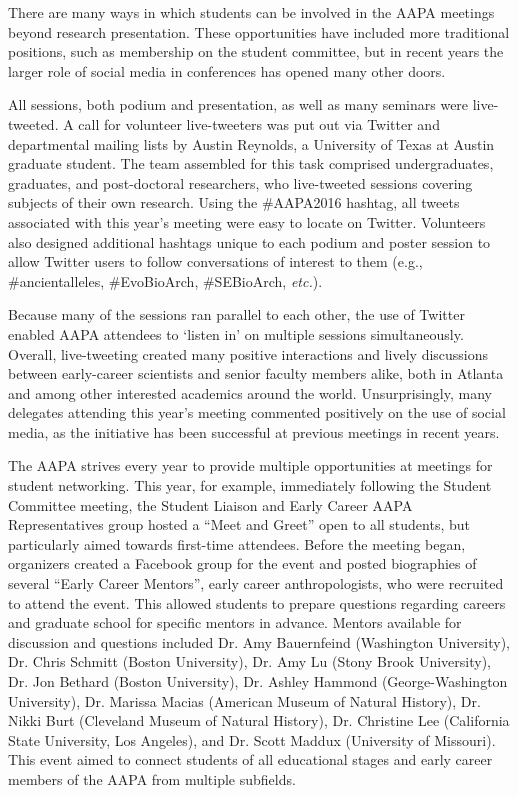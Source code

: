 \documentclass[english]{ijsra}
\begin{document}
There  are many ways in which students can be involved in the AAPA meetings beyond research presentation.  These opportunities have included more traditional positions, such as membership on the student committee, but in recent years the larger role of social media in conferences has opened many other doors.  

All sessions, both podium and presentation, as well as many seminars were live-tweeted.
A call for volunteer live-tweeters was put out via Twitter and departmental mailing lists by Austin Reynolds,
a University of Texas at Austin graduate student. 
The team assembled for this task comprised undergraduates, graduates, and post-doctoral researchers, 
who live-tweeted sessions covering subjects of their own research. 
Using the #AAPA2016 hashtag, all tweets associated with this year’s meeting were easy to locate on Twitter. 
Volunteers also designed additional hashtags unique to each podium and poster session to allow Twitter users to
follow conversations of interest to them (e.g., #ancientalleles, #EvoBioArch, #SEBioArch, \emph{etc.}).%

Because many of the sessions ran parallel to each other, the use of Twitter enabled AAPA attendees to ‘listen in’ on multiple sessions simultaneously. 
Overall, live-tweeting created many positive interactions and lively discussions between early-career scientists and senior faculty members alike, both in Atlanta and among other interested academics around the world.
Unsurprisingly, many delegates attending this year’s meeting commented positively on the use of social media, as the initiative has been successful at previous meetings in recent years.

The  AAPA strives every year to provide multiple opportunities at meetings for student networking.
This year, for example, immediately following the Student Committee meeting, 
the Student Liaison and Early Career AAPA Representatives group hosted a “Meet and Greet” open to all students,
but particularly aimed towards first-time attendees. 
Before the meeting began, organizers created a Facebook group for the event and posted biographies of several “Early Career Mentors”,
early career anthropologists, who were recruited to attend the event.
This allowed students to prepare questions regarding careers and graduate school for specific mentors in advance.  
Mentors available for discussion and questions included Dr. Amy Bauernfeind (Washington University),
Dr. Chris Schmitt (Boston University), Dr. Amy Lu (Stony Brook University), Dr. Jon Bethard (Boston University),
Dr. Ashley Hammond (George-Washington University), Dr. Marissa Macias (American Museum of Natural History),
Dr. Nikki Burt (Cleveland Museum of Natural History), Dr. Christine Lee (California State University, Los Angeles),
and Dr. Scott Maddux (University of Missouri).
This event aimed to connect students of all educational stages and early career members of the AAPA from multiple subfields.  
\end{document}

